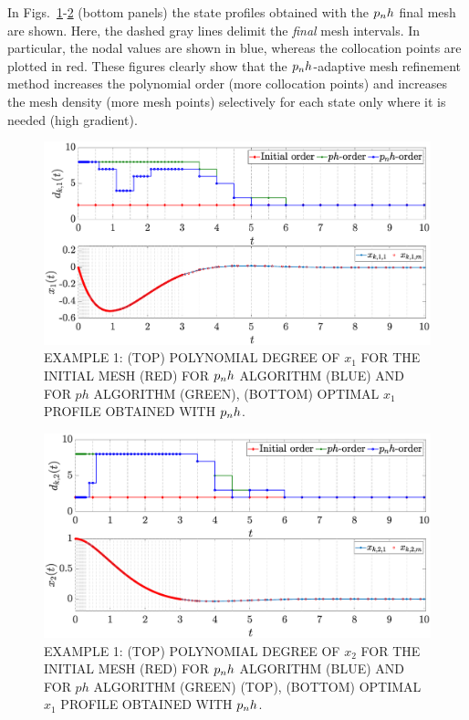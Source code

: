 In Figs.~\ref{fig:pnh1vanderpol}-\ref{fig:pnh2vanderpol} (bottom panels) the state profiles obtained with the $p_{n}h$ final mesh are shown. Here, the dashed gray lines delimit the \emph{final} mesh intervals. In particular, the nodal values are shown in blue, whereas the collocation points are plotted in red. These figures clearly show that the $p_{n}h$-adaptive mesh refinement method increases the polynomial order (more collocation points) and increases the mesh density (more mesh points) selectively for each state only where it is needed (high gradient).
\begin{figure}[t]
	\centering
	\includegraphics[trim={1cm 0.1cm 2cm 0.5cm},clip,width=1\columnwidth]{Img/pnh1_vanderpol1}
	\caption{EXAMPLE 1:  (TOP) POLYNOMIAL DEGREE OF $x_{1}$ FOR THE INITIAL MESH (RED) FOR $p_{n}h$ ALGORITHM (BLUE) AND FOR $ph$ ALGORITHM (GREEN), (BOTTOM)
	OPTIMAL $x_1$ PROFILE OBTAINED WITH $p_{n}h$.}
	\label{fig:pnh1vanderpol}
\end{figure}
\begin{figure}[t]
	\centering
	\includegraphics[trim={1cm 0.1cm 2cm 0.5cm},clip,width=1\columnwidth]{Img/pnh2_vanderpol2}
	\caption{EXAMPLE 1: (TOP) POLYNOMIAL DEGREE OF $x_{2}$ FOR THE INITIAL MESH (RED) FOR $p_{n}h$ ALGORITHM (BLUE) AND FOR $ph$ ALGORITHM (GREEN) (TOP), (BOTTOM)
	OPTIMAL $x_1$ PROFILE OBTAINED WITH  $p_{n}h$.}
	\label{fig:pnh2vanderpol}
\end{figure}
